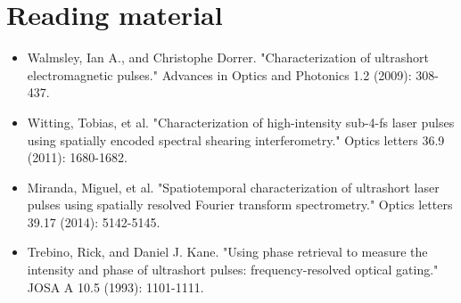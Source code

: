 \documentclass[12pt,a4paper]{report}
\begin{document}
\section*{Reading material}
\begin{itemize}
\item Walmsley, Ian A., and Christophe Dorrer. "Characterization of ultrashort electromagnetic pulses." Advances in Optics and Photonics 1.2 (2009): 308-437.
\item Witting, Tobias, et al. "Characterization of high-intensity sub-4-fs laser pulses using spatially encoded spectral shearing interferometry." Optics letters 36.9 (2011): 1680-1682.
\item Miranda, Miguel, et al. "Spatiotemporal characterization of ultrashort laser pulses using spatially resolved Fourier transform spectrometry." Optics letters 39.17 (2014): 5142-5145.
\item Trebino, Rick, and Daniel J. Kane. "Using phase retrieval to measure the intensity and phase of ultrashort pulses: frequency-resolved optical gating." JOSA A 10.5 (1993): 1101-1111.
\end{itemize}

\end{document}
